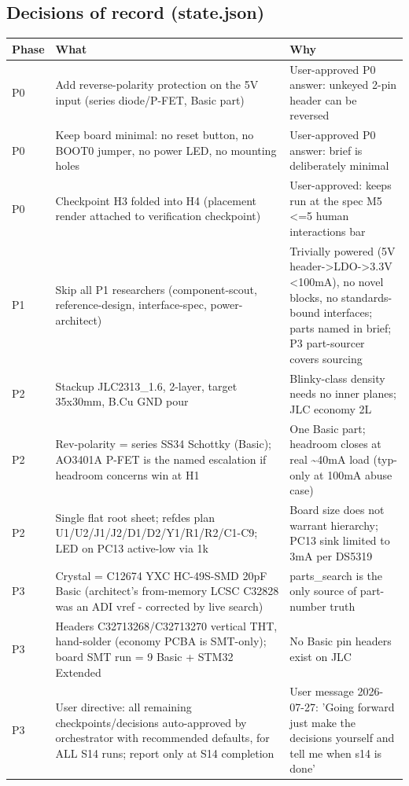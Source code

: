\documentclass[11pt,a4paper]{article}
\begin{document}
\subsection*{Decisions of record (state.json)}
{\small
\begin{longtable}{lp{5.2cm}p{7.2cm}}
\toprule
\textbf{Phase} & \textbf{What} & \textbf{Why} \\
\midrule
\endhead
P0 & Add reverse-polarity protection on the 5V input (series diode/P-FET, Basic part) & User-approved P0 answer: unkeyed 2-pin header can be reversed \\
P0 & Keep board minimal: no reset button, no BOOT0 jumper, no power LED, no mounting holes & User-approved P0 answer: brief is deliberately minimal \\
P0 & Checkpoint H3 folded into H4 (placement render attached to verification checkpoint) & User-approved: keeps run at the spec M5 \textless{}=5 human interactions bar \\
P1 & Skip all P1 researchers (component-scout, reference-design, interface-spec, power-architect) & Trivially powered (5V header-\textgreater{}LDO-\textgreater{}3.3V \textless{}100mA), no novel blocks, no standards-bound interfaces; parts named in brief; P3 part-sourcer covers sourcing \\
P2 & Stackup JLC2313\_1.6, 2-layer, target 35x30mm, B.Cu GND pour & Blinky-class density needs no inner planes; JLC economy 2L \\
P2 & Rev-polarity = series SS34 Schottky (Basic); AO3401A P-FET is the named escalation if headroom concerns win at H1 & One Basic part; headroom closes at real \textasciitilde{}40mA load (typ-only at 100mA abuse case) \\
P2 & Single flat root sheet; refdes plan U1/U2/J1/J2/D1/D2/Y1/R1/R2/C1-C9; LED on PC13 active-low via 1k & Board size does not warrant hierarchy; PC13 sink limited to 3mA per DS5319 \\
P3 & Crystal = C12674 YXC HC-49S-SMD 20pF Basic (architect's from-memory LCSC C32828 was an ADI vref - corrected by live search) & parts\_search is the only source of part-number truth \\
P3 & Headers C32713268/C32713270 vertical THT, hand-solder (economy PCBA is SMT-only); board SMT run = 9 Basic + STM32 Extended & No Basic pin headers exist on JLC \\
P3 & User directive: all remaining checkpoints/decisions auto-approved by orchestrator with recommended defaults, for ALL S14 runs; report only at S14 completion & User message 2026-07-27: 'Going forward just make the decisions yourself and tell me when s14 is done' \\

\end{longtable}}
\end{document}
